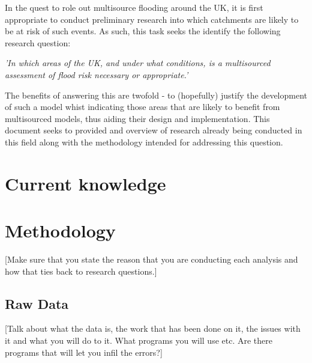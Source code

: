 \documentclass[DIV=calc, paper=a4, fontsize=11pt, twocolumn]{scrartcl}	 %
\begin{document}
In the quest to role out multisource flooding around the UK, it is first appropriate to conduct preliminary research into which catchments are likely to be at risk of such events. As such, this task seeks the identify the following research question:
\begin{center}
	\textit{'In which areas of the UK, and under what conditions, is a multisourced assessment of flood risk necessary or appropriate.'}
\end{center}
The benefits of answering this are twofold - to (hopefully) justify the development of such a model whist indicating those areas that are likely to benefit from multisourced models, thus aiding their design and implementation. This document seeks to provided and overview of research already being conducted in this field along with the methodology intended for  addressing this question.


\section{Current knowledge}

\section{Methodology}
[Make sure that you state the reason that you are conducting each analysis and how that ties back to research questions.]\\

	\subsection{Raw Data}
[Talk about what the data is, the work that has been done on it, the issues with it and what you will do to it. What programs you will use etc. Are there programs that will let you infil the errors?]\\
\end{document}
